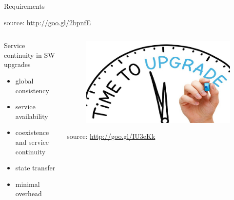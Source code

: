 \begin{frame}{Requirements}
{\begin{figure}
		\end{figure}
		\begin{flushright}
			\tiny{source: \url{http://goo.gl/2bpnfE}}
		\end{flushright}
	}
	\only<7>
	{
		\begin{columns}
			\begin{column}{0.55\textwidth}
				Service continuity in SW upgrades
				\begin{itemize}
					\item{\footnotesize{global consistency}}
					\item{\footnotesize{service availability}}
					\item{\footnotesize{coexistence and service continuity}}
					\item{\footnotesize{state transfer}}
					\item{\footnotesize{minimal overhead}}
				\end{itemize}
			\end{column}
			\begin{column}{0.45\textwidth}
				\begin{figure}
					\centering{}
					\includegraphics[scale=0.5, angle=10]{images/upgrade.png}
				\end{figure}
				\begin{flushright}
					\tiny{source: \url{http://goo.gl/IU3eKk}}
				\end{flushright}
			\end{column}
		\end{columns}
	}
\end{frame}

